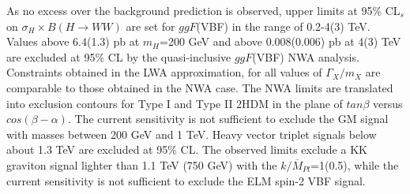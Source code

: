 \documentclass{PoS}
\begin{document}
As no excess over the background prediction is observed, upper limits at 95\% CL$_s$ on $\sigma_H \times B(H\rightarrow WW)$ are set for $ggF$(VBF) in the range of 0.2-4(3) TeV. 
Values above 6.4(1.3) pb at $m_H$=200 GeV and above 0.008(0.006) pb at 4(3) TeV are excluded at 95\% CL by the quasi-inclusive $ggF$(VBF) NWA analysis.
Constraints obtained in the LWA approximation, for all values of $\Gamma_X/m_X$ are comparable to those obtained in the NWA case.
The NWA limits are translated into exclusion contours  for Type I and Type II 2HDM in the plane of $tan \beta$ versus $cos(\beta-\alpha)$.
The current sensitivity is not sufficient to exclude the GM signal with masses between 200 GeV and 1 TeV.
Heavy vector triplet signals below about 1.3 TeV are excluded at 95\% CL. 
The observed limits exclude a KK graviton signal lighter than 1.1 TeV (750 GeV) with the $k/\overline{M}_{Pl}$=1(0.5), while the current sensitivity is not sufficient to exclude the ELM spin-2 VBF signal. 
\end{document}
